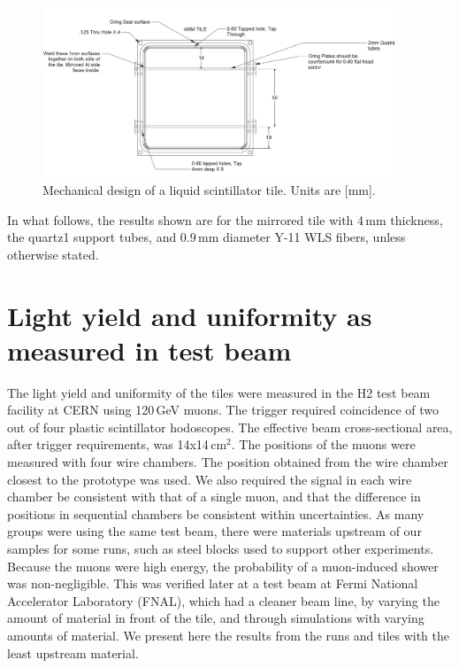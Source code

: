 \documentclass[review]{elsarticle}
\begin{document}
\begin{figure}[!ht]
\begin{center}
\includegraphics[width=0.95\textwidth]{./figures/mechanicaldesign.png}
\caption{Mechanical design of a liquid scintillator tile. Units are
  [mm].}
\label{fig:tiledesign}
\end{center}
\end{figure}

In what follows, the results shown are for the mirrored tile with 4\,mm
thickness, the quartz1 support tubes, and 0.9\,mm diameter Y-11 WLS fibers,
unless otherwise stated.

\section{Light yield and uniformity as measured in test beam}

The light yield and uniformity of the tiles were measured in the H2
test beam facility at CERN using 120\,GeV muons. The trigger required
coincidence of two out of four plastic scintillator hodoscopes. The
effective beam cross-sectional area, after trigger requirements, was
14x14\,cm$^2$. The positions of the muons were measured with four
wire chambers. The position obtained from the wire chamber closest to the
prototype was used. We also required the signal in each wire chamber
be consistent with that of a single muon, and that the difference in
positions in sequential chambers be consistent within uncertainties.
As many groups were using the same test beam, there were materials
upstream of our samples for some runs, such as steel blocks
used to support other experiments. Because the
muons were high energy, the probability of a muon-induced shower was
non-negligible. This was verified later at a test beam at Fermi National
Accelerator Laboratory
(FNAL), which
had a cleaner beam line, by varying the amount of material in front of the tile,
and through simulations with varying amounts of material. 
We present here the
results from the runs and tiles with the least upstream material.
\end{document}
